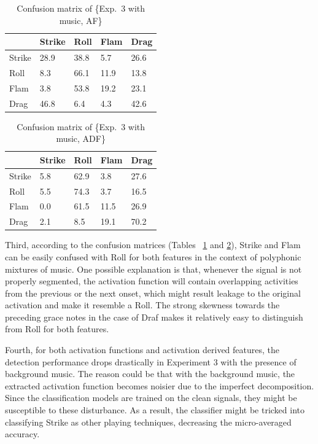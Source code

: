 \documentclass{article}
\begin{document}
\begin{table}[]
\centering
\begin{tabular}{l|llll}
       & Strike & Roll & Flam & Drag \\ \hline
Strike & 28.9   & 38.8 & 5.7  & 26.6 \\
Roll   & 8.3    & 66.1 & 11.9 & 13.8 \\
Flam   & 3.8    & 53.8 & 19.2 & 23.1 \\
Drag   & 46.8   & 6.4  & 4.3  & 42.6
\end{tabular}
\caption{Confusion matrix of \{Exp.~3 with music, AF\} {\color{red}{why braces? Also, you have to mention that these are percentages. It might be good to add the number of observations per class to the table as well...}}}
\label{EXP3_music_AF}
\end{table}

\begin{table}[]
\centering
\begin{tabular}{l|llll}
       & Strike & Roll & Flam & Drag \\ \hline
Strike & 5.8    & 62.9 & 3.8  & 27.6 \\
Roll   & 5.5    & 74.3 & 3.7  & 16.5 \\
Flam   & 0.0    & 61.5 & 11.5 & 26.9 \\
Drag   & 2.1    & 8.5  & 19.1 & 70.2
\end{tabular}
\caption{Confusion matrix of \{Exp.~3 with music, ADF\}}
\label{EXP3_music_ADF}
\end{table}

Third, according to the confusion matrices (Tables~ \ref{EXP3_music_AF} and \ref{EXP3_music_ADF}), Strike and Flam can be easily confused with Roll for both features in the context of polyphonic mixtures of music. One possible explanation is that, whenever the signal is not properly segmented, the activation function will contain overlapping activities from the previous or the next onset, which might result leakage to the original activation and make it resemble a Roll. The strong skewness towards the preceding grace notes in the case of Draf makes it relatively easy to distinguish from Roll for both features.  

Fourth, for both activation functions and activation derived features, the detection performance drops drastically in Experiment 3 with the presence of background music. The reason could be that with the background music, the extracted activation function becomes noisier due to the imperfect decomposition. Since the classification models are trained on the clean signals, they might be susceptible to these disturbance. As a result, the classifier might be tricked into classifying Strike as other playing techniques, decreasing the micro-averaged accuracy. 
\end{document}
